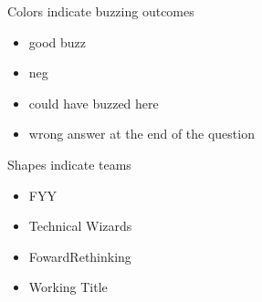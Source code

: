 \begin{frame}
\begin{block}{Colors indicate buzzing outcomes}
\begin{itemize}
    \item[]  good buzz
    \item[]  neg
    \item[]  could have buzzed here
    \item[]  wrong answer at the end of the question
\end{itemize}
\end{block}
\begin{block}{Shapes indicate teams}
\begin{itemize}
    \item[]  FYY
    \item[]  Technical Wizards
    \item[]  FowardRethinking
    \item[]  Working Title
\end{itemize}
\end{block}
\end{frame}

